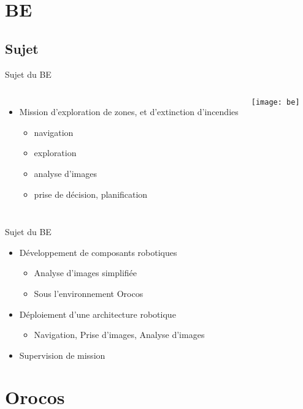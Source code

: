 \documentclass[compress]{beamer}
\begin{document}
\section{BE}

\begin{frame}
\end{frame}

\subsection{Sujet}
\begin{frame}{Sujet du BE}
\begin{columns}
	\begin{itemize}
	\item Mission d'exploration de zones, et d'extinction d'incendies
		\begin{itemize}
		\item navigation
		\item exploration
		\item analyse d'images
		\item prise de décision, planification
		\end{itemize}
	\end{itemize}
	\texttt{[image: be]}
\end{columns}
\end{frame}

\begin{frame}{Sujet du BE}
\begin{itemize}
\item Développement de composants robotiques
	\begin{itemize}
	\item Analyse d'images simplifiée
	\item Sous l'environnement Orocos
	\end{itemize}
\item Déploiement d'une architecture robotique
	\begin{itemize}	
	\item Navigation, Prise d'images, Analyse d'images
	\end{itemize}
\item Supervision de mission
\end{itemize}
\end{frame}

\section{Orocos\hspace{2cm}}
\end{document}
